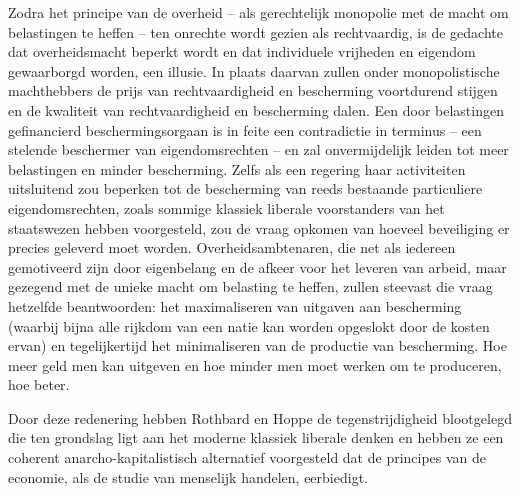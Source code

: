 \begin{blockquotebox}
Zodra het principe van de overheid -- als gerechtelijk monopolie met de macht om belastingen te heffen -- ten onrechte wordt gezien als rechtvaardig, is de gedachte dat overheidsmacht beperkt wordt en dat individuele vrijheden en eigendom gewaarborgd worden, een illusie. In plaats daarvan zullen onder monopolistische machthebbers de prijs van rechtvaardigheid en bescherming voortdurend stijgen en de kwaliteit van rechtvaardigheid en bescherming dalen. Een door belastingen gefinancierd beschermingsorgaan is in feite een contradictie in terminus -- een stelende beschermer van eigendomsrechten -- en zal onvermijdelijk leiden tot meer belastingen en minder bescherming. Zelfs als een regering haar activiteiten uitsluitend zou beperken tot de bescherming van reeds bestaande particuliere eigendomsrechten, zoals sommige klassiek liberale voorstanders van het staatswezen hebben voorgesteld, zou de vraag opkomen van hoeveel beveiliging er precies geleverd moet worden. Overheidsambtenaren, die net als iedereen gemotiveerd zijn door eigenbelang en de afkeer voor het leveren van arbeid, maar gezegend met de unieke macht om belasting te heffen, zullen steevast die vraag hetzelfde beantwoorden: het maximaliseren van uitgaven aan bescherming (waarbij bijna alle rijkdom van een natie kan worden opgeslokt door de kosten ervan) en tegelijkertijd het minimaliseren van de productie van bescherming. Hoe meer geld men kan uitgeven en hoe minder men moet werken om te produceren, hoe beter.\footnotemark
\end{blockquotebox}
\autocite{206}

Door deze redenering hebben Rothbard en Hoppe de tegenstrijdigheid blootgelegd die ten grondslag ligt aan het moderne klassiek liberale denken en hebben ze een coherent anarcho-kapitalistisch alternatief voorgesteld dat de principes van de economie, als de studie van menselijk handelen, eerbiedigt.

